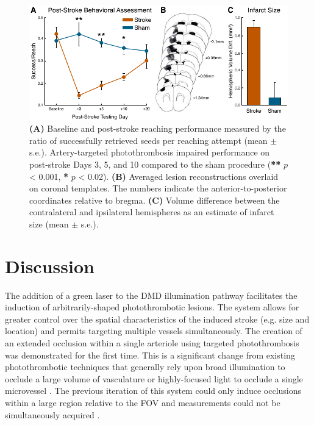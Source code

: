 \begin{figure}
    \includegraphics{figures/chapter_3/functionalimpairment.pdf}
    \caption{
        \label{fig:functionalimpairment}
        \textbf{(A)} Baseline and post-stroke reaching performance measured by the ratio of successfully retrieved seeds per reaching attempt (mean $\pm$ s.e.). Artery-targeted photothrombosis impaired performance on post-stroke Days 3, 5, and 10 compared to the sham procedure (\textbf{**} $p$ \textless{} 0.001, \textbf{*} $p$ \textless{} 0.02). \textbf{(B)} Averaged lesion reconstructions overlaid on coronal templates. The numbers indicate the anterior-to-posterior coordinates relative to bregma. \textbf{(C)} Volume difference between the contralateral and ipsilateral hemispheres as an estimate of infarct size (mean $\pm$ s.e.).
    }
\end{figure}



\section{Discussion}

The addition of a green laser to the DMD illumination pathway facilitates the induction of arbitrarily-shaped photothrombotic lesions. The system allows for greater control over the spatial characteristics of the induced stroke (e.g. size and location) and permits targeting multiple vessels simultaneously. The creation of an extended occlusion within a single arteriole using targeted photothrombosis was demonstrated for the first time. This is a significant change from existing photothrombotic techniques that generally rely upon broad illumination to occlude a large volume of vasculature \cite{Watson:1985bp, Schrandt:2015gu} or highly-focused light to occlude a single microvessel \cite{Schaffer:2006fb}. The previous iteration of this system could only induce occlusions within a large region relative to the FOV and  measurements could not be simultaneously acquired \cite{Ponticorvo:2010uv}.

